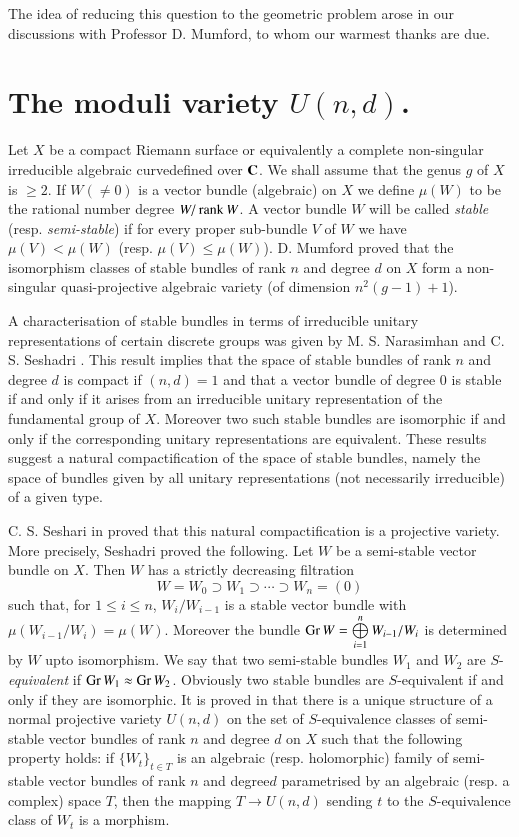 The idea of reducing this question to the geometric problem arose in our discussions with Professor D. Mumford, to whom our warmest thanks are due.

\section{The moduli variety \texorpdfstring{$U(n,d)$}{Und}.}\label{art17-sec2}

Let $X$ be a compact Riemann surface or equivalently a complete non-singular irreducible algebraic curve\pageoriginale defined over $\mathbf{C}$. We shall assume that the genus $g$ of $X$ is $\geq 2$. If $W(\neq 0)$ is a vector bundle (algebraic) on $X$ we define $\mu(W)$ to be the rational number degree $W/\operatorname{\mathrm{rank}} W$. A vector bundle $W$ will be called {\em stable} (resp. {\em semi-stable}) if for every proper sub-bundle $V$ of $W$ we have $\mu(V)<\mu(W)$ (resp. $\mu(V)\leq \mu(W)$). D. Mumford proved that the isomorphism classes of stable bundles of rank $n$ and degree $d$ on $X$ form a non-singular quasi-projective algebraic variety (of dimension $n^{2}(g-1)+1$).

A characterisation of stable bundles in terms of irreducible unitary representations of certain discrete groups was given by M. S. Narasimhan and C. S. Seshadri \cite{art17-key4}. This result implies that the space of stable bundles of rank $n$ and degree $d$ is compact if $(n,d)=1$ and that a vector bundle of degree 0 is stable if and only if it arises from an irreducible unitary representation of the fundamental group of $X$. Moreover two such stable bundles are isomorphic if and only if the corresponding unitary representations are equivalent. These results suggest a natural compactification of the space of stable bundles, namely the space of bundles given by all unitary representations (not necessarily irreducible) of a given type.

C. S. Seshari in \cite{art17-key7} proved that this natural compactification is a projective variety. More precisely, Seshadri proved the following. Let $W$ be a semi-stable vector bundle on $X$. Then $W$ has a strictly decreasing filtration
$$
W=W_{0}\supset W_{1}\supset \cdots \supset W_{n}=(0)
$$
such that, for $1\leq i\leq n$, $W_{i}/W_{i-1}$ is a stable vector bundle with $\mu(W_{i-1}/W_{i})=\mu(W)$. Moreover the bundle $\operatorname{\mathrm{Gr}} W=\bigoplus\limits^{n}_{i=1}W_{i-1}/W_{i}$ is determined by $W$ upto isomorphism. We say that two semi-stable bundles $W_{1}$ and $W_{2}$ are $S$-{\em equivalent} if $\operatorname{\mathrm{Gr}} W_{1}\approx \operatorname{\mathrm{Gr}} W_{2}$. Obviously two stable bundles are $S$-equivalent if and only if they are isomorphic. It is proved in \cite{art17-key7} that there is a unique structure of a normal projective variety $U(n,d)$ on the set of $S$-equivalence classes of semi-stable vector bundles of rank $n$ and degree $d$ on $X$ such that the following property holds: if $\{W_{t}\}_{t\in T}$ is an algebraic (resp. holomorphic) family of semi-stable vector bundles of rank $n$ and degree\pageoriginale $d$ parametrised by an algebraic (resp. a complex) space $T$, then the mapping $T\to U(n,d)$ sending $t$ to the $S$-equivalence class of $W_{t}$ is a morphism.


